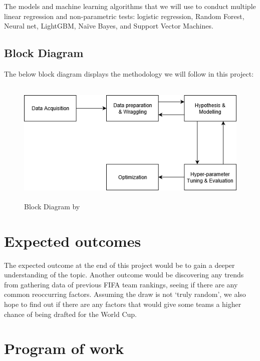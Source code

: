 \documentclass[11pt,a4paper]{article}
\begin{document}
The models and machine learning algorithms that we will use to conduct multiple linear regression and non-parametric tests: logistic regression, Random Forest, Neural net, LightGBM, Naïve Bayes, and Support Vector Machines.

\newpage

\subsection{Block Diagram}
The below block diagram displays the methodology we will follow in this project:

\begin{figure}[h]
	\includegraphics[height=6cm,width=\linewidth]{methodflow.PNG}
	\caption{Block Diagram by \citet{mrthlinh_2018}}
\end{figure}


\section{Expected outcomes}


The expected outcome at the end of this project would be to gain a deeper understanding of the topic. Another outcome would be discovering any trends from gathering data of previous FIFA team rankings, seeing if there are any common reoccurring factors. Assuming the draw is not ‘truly random’, we also hope to find out if there are any factors that would give some teams a higher chance of being drafted for the World Cup. 

\newpage

\section{Program of work}

\end{document}

